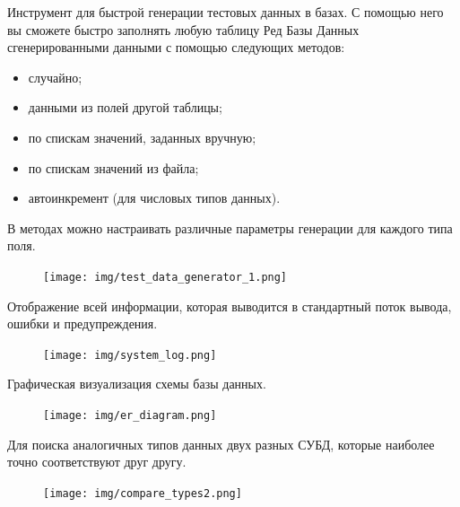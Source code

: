 
Инструмент для быстрой генерации тестовых данных в базах.  С помощью него вы сможете быстро заполнять любую таблицу Ред Базы Данных сгенерированными данными с помощью следующих методов:
\begin{itemize}
	\item случайно;
	\item данными из полей другой таблицы;
	\item по спискам значений, заданных вручную;
	\item по спискам значений из файла;
	\item автоинкремент (для числовых типов данных).
\end{itemize}
В методах можно настраивать различные параметры генерации для каждого типа поля. 

\begin{figure}[H]
	\centering
	\texttt{[image: img/test\_data\_generator\_1.png]}
\end{figure}


Отображение всей информации, которая выводится в стандартный поток вывода, ошибки и предупреждения.
	\begin{figure}[H]
		\centering
		\texttt{[image: img/system\_log.png]}
	\end{figure}


Графическая визуализация схемы базы данных.
	\begin{figure}[H]
		\centering
		\texttt{[image: img/er\_diagram.png]}
	\end{figure}


Для поиска аналогичных типов данных двух разных СУБД, которые наиболее точно соответствуют друг другу.
	\begin{figure}[H]
		\centering
		\texttt{[image: img/compare\_types2.png]}
	\end{figure}


